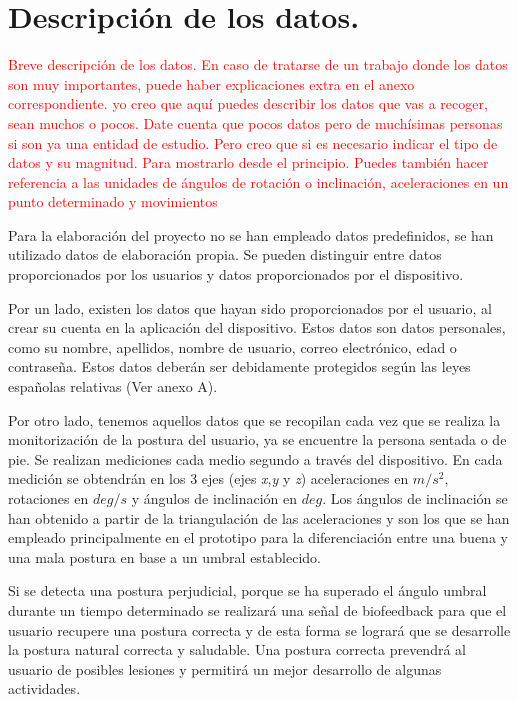 
\section{Descripción de los datos.}
\textcolor{red}{
Breve descripción de los datos.
En caso de tratarse de un trabajo donde los datos son muy importantes, puede haber explicaciones extra en el anexo correspondiente. yo creo que aquí puedes describir los datos que vas a recoger, sean muchos o pocos. Date cuenta que pocos datos pero de muchísimas personas si son ya una entidad de estudio. 
Pero creo que si es necesario indicar el tipo de datos y su magnitud. Para mostrarlo desde el principio. Puedes también hacer referencia a las unidades de ángulos de rotación o inclinación, aceleraciones en un punto determinado y movimientos }

Para la elaboración del proyecto no se han empleado datos predefinidos, se han utilizado datos de elaboración propia. Se pueden distinguir entre datos proporcionados por los usuarios y datos proporcionados por el dispositivo.

Por un lado, existen los datos que hayan sido proporcionados por el usuario, al crear su cuenta en la aplicación del dispositivo. Estos datos son datos personales, como su nombre, apellidos, nombre de usuario, correo electrónico, edad o contraseña. Estos datos deberán ser debidamente protegidos según las leyes españolas relativas (Ver anexo A).

Por otro lado, tenemos aquellos datos que se recopilan cada vez que se realiza la monitorización de la postura del usuario, ya se encuentre la persona sentada o de pie. Se realizan mediciones cada medio segundo a través del dispositivo. En cada medición se obtendrán en los 3 ejes (ejes \textit{x},\textit{y} y \textit{z}) aceleraciones en $m/s^{2}$, rotaciones en $deg/s$ y ángulos de inclinación en $deg$. Los ángulos de inclinación se han obtenido a partir de la triangulación de las aceleraciones y son los que se han empleado principalmente en el prototipo para la diferenciación entre una buena y una mala postura en base a un umbral establecido. 

Si se detecta una postura perjudicial, porque se ha superado el ángulo umbral durante un tiempo determinado se realizará una señal de biofeedback para que el usuario recupere una postura correcta y de esta forma se logrará que se desarrolle la postura natural correcta y saludable. Una postura correcta prevendrá al usuario de posibles lesiones y permitirá un mejor desarrollo de algunas actividades.

